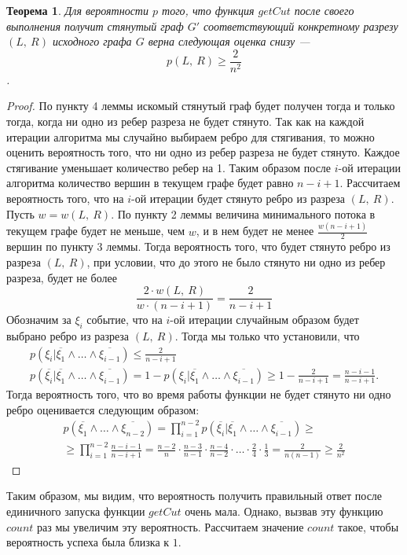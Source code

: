 \documentclass[a4paper,12pt]{article}
\newtheorem*{theorem}{Теорема}
\begin{document}
\begin{theorem}
 Для вероятности $p$ того, что функция $getCut$ после своего выполнения получит стянутый граф $G'$ соответствующий конкретному разрезу $(L,\ R)$ исходного графа $G$ верна следующая оценка снизу — \[p(L,\ R) \geqslant \frac{2}{n^2}\].
\end{theorem}
\begin{proof}
По пункту 4 леммы искомый стянутый граф будет получен тогда и только тогда, когда ни одно из ребер разреза не будет стянуто. Так как на каждой итерации алгоритма мы случайно выбираем ребро для стягивания, то можно оценить вероятность того, что ни одно из ребер разреза не будет стянуто. Каждое стягивание уменьшает количество ребер на 1. Таким образом после $i$-ой итерации алгоритма количество вершин в текущем графе будет равно $n - i + 1$. Рассчитаем вероятность того, что на $i$-ой итерации будет стянуто ребро из разреза $(L,\ R)$. Пусть $w = w(L,\ R)$. По пункту 2 леммы величина минимального потока в текущем графе будет не меньше, чем $w$, и в нем будет не менее $\frac{w(n-i+1)}{2}$ вершин по пункту 3 леммы. Тогда вероятность того, что будет стянуто ребро из разреза $(L,\ R)$, при условии, что до этого не было стянуто ни одно из ребер разреза, будет не более \[\frac{2\cdot w(L,\ R)}{w\cdot (n-i+1)}=\frac{2}{n-i+1}\]
Обозначим за $\xi_i$ событие, что на $i$-ой итерации случайным образом будет выбрано ребро из разреза $(L,\ R)$. Тогда мы только что установили, что
\begin{gather*}
p(\xi_i | \overline{\xi_1} \wedge \ldots \wedge \overline{\xi_{i-1}}) \leqslant \frac{2}{n-i+1}\\
p(\overline{\xi_i} | \overline{\xi_1} \wedge \ldots \wedge \overline{\xi_{i-1}}) = 1 - p(\xi_i | \overline{\xi_1} \wedge \ldots \wedge \overline{\xi_{i-1}}) \geqslant 1 - \frac{2}{n-i+1} = \frac{n-i-1}{n-i+1}.
\end{gather*}
Тогда вероятность того, что во время работы функции не будет стянуто ни одно ребро оценивается следующим образом:
\begin{gather*}
p(\overline{\xi_1} \wedge \ldots \wedge \overline{\xi_{n-2}}) = \prod\limits_{i=1}^{n-2} p(\overline{\xi_i} | \overline{\xi_1} \wedge \ldots \wedge \overline{\xi_{i-1}}) \geqslant\\
\geqslant \prod\limits_{i=1}^{n-2} \frac{n-i-1}{n-i+1} = \frac{n - 2}{n} \cdot \frac{n-3}{n-1} \cdot \frac{n-4}{n-2} \cdot \ldots \cdot \frac{2}{4} \cdot \frac{1}{3} = \frac{2}{n(n-1)} \geqslant \frac{2}{n^2}
\end{gather*}
\end{proof}
Таким образом, мы видим, что вероятность получить правильный ответ после единичного запуска функции $getCut$ очень мала. Однако, вызвав эту функцию $count$ раз мы увеличим эту вероятность. Рассчитаем значение $count$ такое, чтобы вероятность успеха была близка к $1$.
\end{document}

